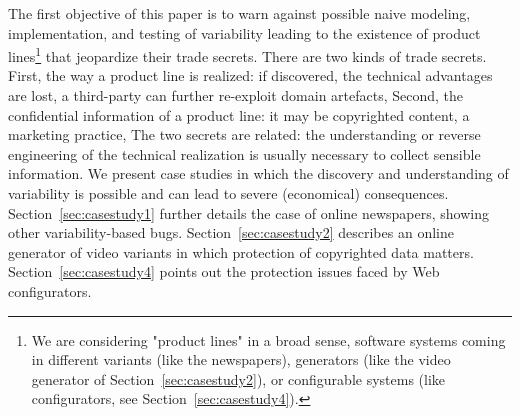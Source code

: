  The first objective of this paper is to warn against possible naive modeling, implementation, and testing of variability leading to the existence of product lines\footnote{We are considering "product lines" in a broad sense, \ie software systems coming in different variants (like the newspapers), generators (like the video generator of Section~\ref{sec:casestudy2}), or configurable systems (like configurators, see Section~\ref{sec:casestudy4}).} that jeopardize their trade secrets.
 There are two kinds of trade secrets. First, the way a product line is realized: if discovered, the technical advantages are lost, a third-party can further re-exploit domain artefacts, \etc Second, the confidential information of a product line: it may be copyrighted content, a marketing practice, \etc The two secrets are related: the understanding or reverse engineering of the technical realization is usually necessary to collect sensible information.
% 
 We present case studies in which the discovery and understanding of variability is possible and can lead to severe (economical) consequences.
 Section~\ref{sec:casestudy1} further details the case of online newspapers, showing other variability-based bugs.
 Section~\ref{sec:casestudy2} describes an online generator of video variants in which protection of copyrighted data matters.
 Section~\ref{sec:casestudy4} points out the protection issues faced by Web configurators.




